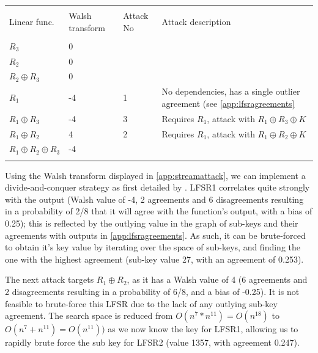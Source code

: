 \documentclass[british,11pt,a4paper]{article}
\begin{document}
\begin{center}
	\begin{tabular}{lllp{6.5cm}}\label{tab:streamattack} \\
		\toprule \\
		Linear func.                  & Walsh transform & Attack No & Attack description                                           \\
		\midrule \\
		\(R_3\) & 0 \\
		\(R_2\)                       & 0               &           &                                                              \\
		\(R_2 \oplus R_3\)            & 0               &           &                                                              \\
		\(R_1\)                       & -4              & 1         & No dependencies, has a single outlier agreement (see \autoref{app:lfsragreements} \\
		\(R_1 \oplus R_3\)            & -4              & 3         & Requires \(R_1\), attack with \(R_1 \oplus R_3 \oplus K\)    \\
		\(R_1 \oplus R_2\)            & 4               & 2         & Requires \(R_1\), attack with \(R_1 \oplus R_2 \oplus K\)    \\
		\(R_1 \oplus R_2 \oplus R_3\) & -4              &           &                                                              \\

		\bottomrule \\
	\end{tabular}
\end{center}
Using the Walsh transform displayed in \autoref{app:streamattack}, we can implement a divide-and-conquer strategy as first detailed by \citet{meider}.
LFSR1 correlates quite strongly with the output (Walsh value of -4, 2 agreements and 6 disagreements resulting in a probability of 2/8 that it will agree with the function's output, with a bias of 0.25); this is reflected by the outlying value in the graph of sub-keys and their agreements with outputs in \autoref{app:lfsragreements}. As such, it can be brute-forced to obtain it's key value by iterating over the space of sub-keys, and finding the one with the highest agreement (sub-key value 27, with an agreement of 0.253).

The next attack targets \(R_1 \oplus R_2\), as it has a Walsh value of 4 (6 agreements and 2 disagreements resulting in a probability of 6/8, and a bias of -0.25). It is not feasible to brute-force this LFSR due to the lack of any outlying sub-key agreement.
The search space is reduced from \(O(n^{7} * n^{11})=O(n^{18})\) to \(O(n^7 + n^{11})=O(n^{11}))\) as we now know the key for LFSR1, allowing us to rapidly brute force the sub key for LFSR2 (value 1357, with agreement 0.247).
\end{document}
